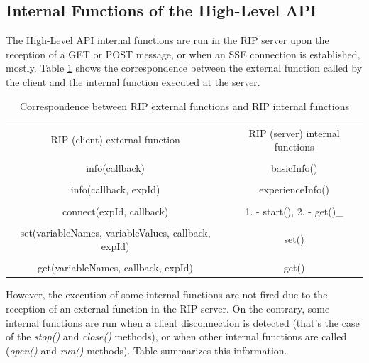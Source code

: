 \subsection{Internal Functions of the High-Level API}
The High-Level API internal functions are run in the RIP server upon the reception of a GET or POST message, or when an SSE connection is established, mostly. Table \ref{tab:internal-external-correspondence} shows the correspondence between the external function called by the client and the internal function executed at the server.

\begin{table}[b!]
    \centering
    \begin{tabular}{|c|c|}
        \hline
        & \\RIP (client) external function & RIP (server) internal functions \\
        \hline
        & \\info(callback) & basicInfo() \\
        \hline
        & \\info(callback, expId) & experienceInfo() \\
        \hline
        & \\connect(expId, callback) & 1. - start(), 2. - get()_{\CircArrowRight{}} \\
        \hline
        & \\set(variableNames, variableValues, callback, expId) & set() \\
        \hline
        & \\get(variableNames, callback, expId) & get() \\
        \hline
    \end{tabular}
    \caption{Correspondence between RIP external functions and RIP internal functions}
    \label{tab:internal-external-correspondence}
\end{table}

However, the execution of some internal functions are not fired due to the reception of an external function in the RIP server. On the contrary, some internal functions are run when a client disconnection is detected (that's the case of the \textit{stop()} and \textit{close()} methods), or when other internal functions are called (\textit{open()} and \textit{run()} methods). Table summarizes this information.


